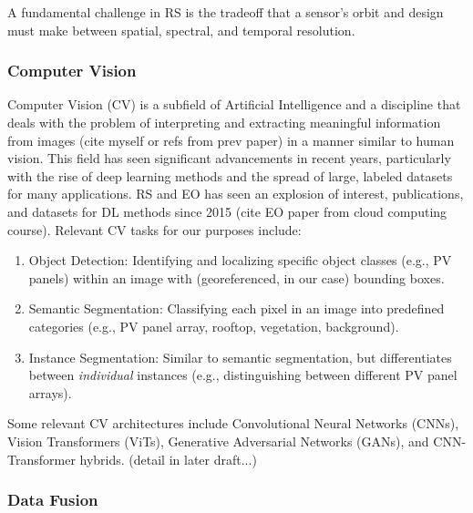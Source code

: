 \begin{multicols}{2}
A fundamental challenge in RS is the tradeoff that a sensor's orbit and design must make between spatial, spectral, and temporal resolution. 

\subsubsection{Computer Vision}

Computer Vision (CV) is a subfield of Artificial Intelligence and a discipline that deals with the problem of interpreting and extracting meaningful information from images (cite myself or refs from prev paper) 
in a manner similar to human vision. This field has seen significant advancements in recent years, particularly with the rise of deep learning methods and the spread of large, labeled datasets for many applications. 
RS and EO has seen an explosion of interest, publications, and datasets for DL methods since 2015 (cite EO paper from cloud computing course). Relevant CV tasks for our purposes include:

\begin{enumerate}
    \item Object Detection: Identifying and localizing specific object classes (e.g., PV panels) within an image with (georeferenced, in our case) bounding boxes.
    \item Semantic Segmentation: Classifying each pixel in an image into predefined categories (e.g., PV panel array, rooftop, vegetation, background).
    \item Instance Segmentation: Similar to semantic segmentation, but differentiates between \textit{individual} instances (e.g., distinguishing between different PV panel arrays). 
\end{enumerate}

Some relevant CV architectures include Convolutional Neural Networks (CNNs), Vision Transformers (ViTs), Generative Adversarial Networks (GANs), and CNN-Transformer hybrids. (detail in later draft...)

\subsubsection{Data Fusion}


\end{multicols}

